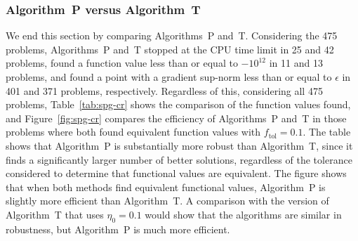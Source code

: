 \documentclass[11pt]{article}
\newcommand{\ftol}{f_{\mathrm{tol}}}
\begin{document}
\subsubsection{Algorithm~P versus Algorithm~T}

We end this section by comparing Algorithms~P and~T. Considering the 475 problems, Algorithms~P and~T stopped at the CPU time limit in 25 and 42 problems, found a function value less than or equal to $-10^{12}$ in 11 and 13 problems, and found a point with a gradient sup-norm less than or equal to $\epsilon$ in 401 and 371 problems, respectively. Regardless of this, considering all 475 problems, Table~\ref{tab:spg-cr} shows the comparison of the function values found, and Figure~\ref{fig:spg-cr} compares the efficiency of Algorithms~P and~T in those problems where both found equivalent function values with $\ftol=0.1$. The table shows that Algorithm~P is substantially more robust than Algorithm~T, since it finds a significantly larger number of better solutions, regardless of the tolerance considered to determine that functional values are equivalent. The figure shows that when both methods find equivalent functional values, Algorithm~P is slightly more efficient than Algorithm~T. A comparison with the version of Algorithm~T that uses $\eta_0=0.1$ would show that the algorithms are similar in robustness, but Algorithm~P is much more efficient.
\end{document}
